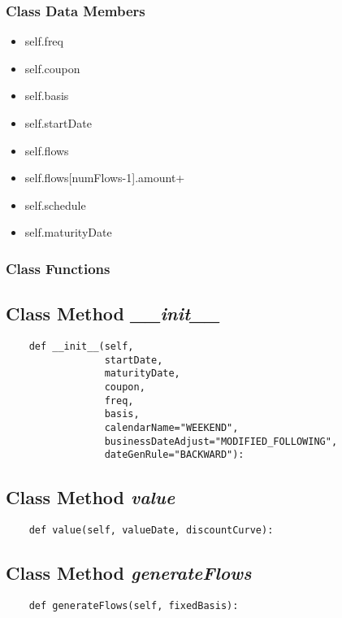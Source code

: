 \documentclass[twoside,11pt]{book}
\begin{document}
\subsubsection{Class Data Members}
\begin{itemize}
\item{self.freq}
\item{self.coupon}
\item{self.basis}
\item{self.startDate}
\item{self.flows}
\item{self.flows[numFlows-1].amount+}
\item{self.schedule}
\item{self.maturityDate}
\end{itemize}

\subsubsection{Class Functions}

\subsection{Class Method {\it \_\_init\_\_}}


\begin{lstlisting}
    def __init__(self,
                 startDate,
                 maturityDate,
                 coupon,
                 freq,
                 basis,
                 calendarName="WEEKEND",
                 businessDateAdjust="MODIFIED_FOLLOWING",
                 dateGenRule="BACKWARD"):
\end{lstlisting}

\subsection{Class Method {\it value}}


\begin{lstlisting}
    def value(self, valueDate, discountCurve):
\end{lstlisting}

\subsection{Class Method {\it generateFlows}}


\begin{lstlisting}
    def generateFlows(self, fixedBasis):
\end{lstlisting}
\end{document}
